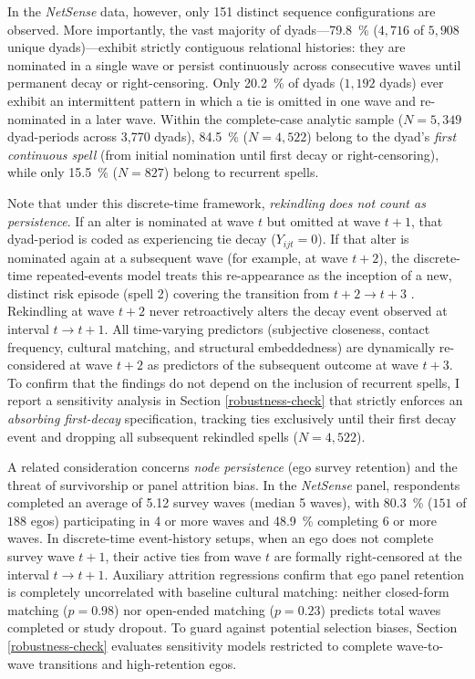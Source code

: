 \documentclass[12pt,letterpaper]{article}
\def\percent{\%}%
\begin{document}
In the \textit{NetSense} data, however, only 151 distinct sequence configurations are observed. More importantly, the vast majority of dyads---\SI{79.8}{\percent} ($4,716$ of $5,908$ unique dyads)---exhibit strictly contiguous relational histories: they are nominated in a single wave or persist continuously across consecutive waves until permanent decay or right-censoring. Only \SI{20.2}{\percent} of dyads ($1,192$ dyads) ever exhibit an intermittent pattern in which a tie is omitted in one wave and re-nominated in a later wave. Within the complete-case analytic sample ($N = 5,349$ dyad-periods across 3,770 dyads), \SI{84.5}{\percent} ($N = 4,522$) belong to the dyad's \textit{first continuous spell} (from initial nomination until first decay or right-censoring), while only \SI{15.5}{\percent} ($N = 827$) belong to recurrent spells.

Note that under this discrete-time framework, \textit{rekindling does not count as persistence}. If an alter is nominated at wave $t$ but omitted at wave $t+1$, that dyad-period is coded as experiencing tie decay ($Y_{ijt} = 0$). If that alter is nominated again at a subsequent wave (for example, at wave $t+2$), the discrete-time repeated-events model treats this re-appearance as the inception of a new, distinct risk episode (spell 2) covering the transition from $t+2 \to t+3$ \citep{allison1982, boxsteffensmeier2004}. Rekindling at wave $t+2$ never retroactively alters the decay event observed at interval $t \to t+1$. All time-varying predictors (subjective closeness, contact frequency, cultural matching, and structural embeddedness) are dynamically re-considered at wave $t+2$ as predictors of the subsequent outcome at wave $t+3$. To confirm that the findings do not depend on the inclusion of recurrent spells, I report a sensitivity analysis in Section \ref{robustness-check} that strictly enforces an \textit{absorbing first-decay} specification, tracking ties exclusively until their first decay event and dropping all subsequent rekindled spells ($N = 4,522$).

A related consideration concerns \textit{node persistence} (ego survey retention) and the threat of survivorship or panel attrition bias. In the \textit{NetSense} panel, respondents completed an average of \num{5.12} survey waves (median 5 waves), with \SI{80.3}{\percent} ($151$ of $188$ egos) participating in 4 or more waves and \SI{48.9}{\percent} completing 6 or more waves. In discrete-time event-history setups, when an ego does not complete survey wave $t+1$, their active ties from wave $t$ are formally right-censored at the interval $t \to t+1$. Auxiliary attrition regressions confirm that ego panel retention is completely uncorrelated with baseline cultural matching: neither closed-form matching ($p = 0.98$) nor open-ended matching ($p = 0.23$) predicts total waves completed or study dropout. To guard against potential selection biases, Section \ref{robustness-check} evaluates sensitivity models restricted to complete wave-to-wave transitions and high-retention egos.
\end{document}
